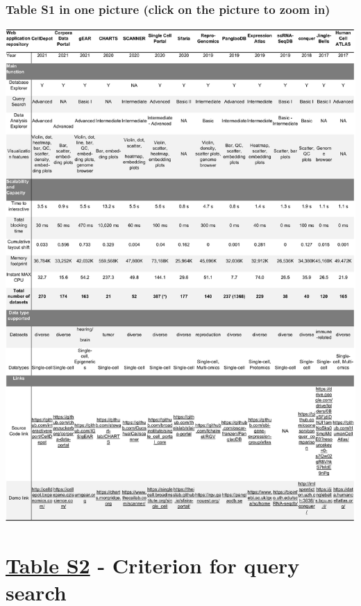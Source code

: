 \documentclass[runningheads]{llncs}
\begin{document}
\hypertarget{table-s1-in-one-picture-click-on-the-picture-to-zoom-in}{%
\subsubsection*{Table S1 in one picture (click on the picture to zoom in)}\label{table-s1-in-one-picture-click-on-the-picture-to-zoom-in}}

\href{figures/table_s1.jpg}{\includegraphics{figures/table_s1.jpg}}

\hypertarget{table-s2---criterion-for-query-search}{%
\section*{\texorpdfstring{\href{https://github.com/interactivereport/CellDepot/blob/gh-pages/bookdown/S2.csv}{Table S2} - Criterion for query search}{Table S2 - Criterion for query search}}\label{table-s2---criterion-for-query-search}}
\end{document}
